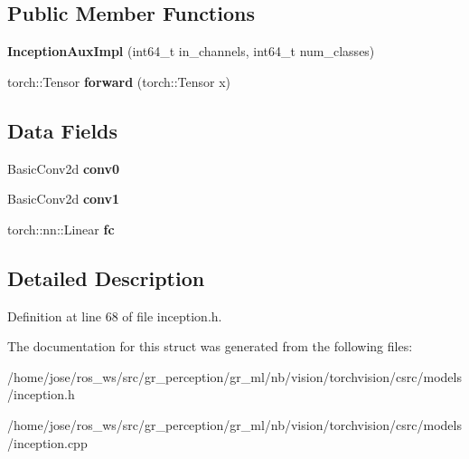 \subsection*{Public Member Functions}
\begin{DoxyCompactItemize}
\item 
\mbox{\label{structvision_1_1models_1_1__inceptionimpl_1_1InceptionAuxImpl_ae4bc74cb21ce9c5af2f8a61b229b5341}} 
{\bfseries Inception\+Aux\+Impl} (int64\+\_\+t in\+\_\+channels, int64\+\_\+t num\+\_\+classes)
\item 
\mbox{\label{structvision_1_1models_1_1__inceptionimpl_1_1InceptionAuxImpl_a525317df2213ee1d83190da1ac2129ef}} 
torch\+::\+Tensor {\bfseries forward} (torch\+::\+Tensor x)
\end{DoxyCompactItemize}
\subsection*{Data Fields}
\begin{DoxyCompactItemize}
\item 
\mbox{\label{structvision_1_1models_1_1__inceptionimpl_1_1InceptionAuxImpl_a14dcaa2601622b8149ed2f0287a98ec7}} 
Basic\+Conv2d {\bfseries conv0}
\item 
\mbox{\label{structvision_1_1models_1_1__inceptionimpl_1_1InceptionAuxImpl_aa3012ac099605969b501cda854b37b6e}} 
Basic\+Conv2d {\bfseries conv1}
\item 
\mbox{\label{structvision_1_1models_1_1__inceptionimpl_1_1InceptionAuxImpl_aefb56a7b4ab3ca94534fb3f699244f97}} 
torch\+::nn\+::\+Linear {\bfseries fc}
\end{DoxyCompactItemize}


\subsection{Detailed Description}


Definition at line 68 of file inception.\+h.



The documentation for this struct was generated from the following files\+:\begin{DoxyCompactItemize}
\item 
/home/jose/ros\+\_\+ws/src/gr\+\_\+perception/gr\+\_\+ml/nb/vision/torchvision/csrc/models/inception.\+h\item 
/home/jose/ros\+\_\+ws/src/gr\+\_\+perception/gr\+\_\+ml/nb/vision/torchvision/csrc/models/inception.\+cpp\end{DoxyCompactItemize}
